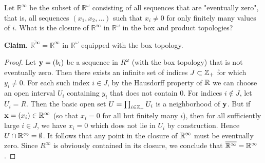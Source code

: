 \begin{exercise}[ID=2.19.7]
    Let $\mathbb{R}^\infty$ be the subset of $\mathbb{R}^\omega$ consisting of all sequences that are "eventually zero", that is, all sequences $(x_1, x_2, \ldots)$ such that $x_i \neq 0$ for only finitely many values of $i$.
    What is the closure of $\mathbb{R}^\infty$ in $\mathbb{R}^\omega$ in the box and product topologies?
\end{exercise}

\begin{solution}
    {\bf Claim.}  $\overline{\mathbb{R}^\infty} = \mathbb{R}^\infty$ in $\mathbb{R}^\omega$ equipped with the box topology.
    \begin{proof}
        Let $\mathbf{y} = (b_i)$ be a sequence in $R^\omega$ (with the box topology) that is not eventually zero.
        Then there exists an infinite set of indices $J \subset \mathbb{Z}_+$ for which $y_i \neq 0$.
        For each such index $i \in J$, by the Hausdorff property of $\mathbb{R}$ we can choose an open interval $U_i$ containing $y_i$ that does not contain $0$.
        For indices $i \notin J$, let $U_i = R$.
        Then the basic open set $U = \prod_{i\in\mathbb{Z}_+} U_i$ is a neighborhood of $\mathbf{y}$.
        But if $\mathbf{x} = (x_i) \in \mathbb{R}^\infty$ (so that $x_i = 0$ for all but finitely many $i$), then for all sufficiently large $i \in J$, we have $x_i = 0$ which does not lie in $U_i$ by construction.
        Hence $U \cap \mathbb{R}^\infty = \emptyset$.
        It follows that any point in the closure of $\mathbb{R}^\infty$ must be eventually zero.
        Since $R^\infty$ is obviously contained in its closure, we conclude that $\overline{\mathbb{R}^\infty} = \mathbb{R}^\infty$.
    \end{proof}
    \bigskip


\end{solution}
